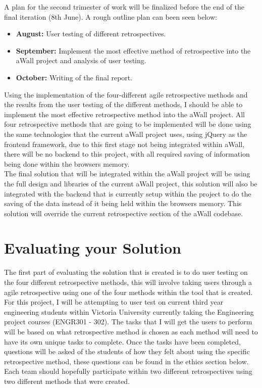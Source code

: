 \documentclass[11pt, a4paper, twoside, openright]{report}
\begin{document}
A plan for the second trimester of work will be finalized before the end of the final iteration (8th June). A rough outline plan can been seen below:
\begin{itemize}
\item \textbf{August:} User testing of different retrospectives.
\item \textbf{September:} Implement the most effective method of retrospective into the aWall project and analysis of user testing.
\item \textbf{October:} Writing of the final report.
\end{itemize}

Using the implementation of the four-different agile retrospective methods and the results from the user testing of the different methods, I should be able to implement the most effective retrospective method into the aWall project. All four retrospective methods that are going to be implemented will be done using the same technologies that the current aWall project uses, using jQuery as the frontend framework, due to this first stage not being integrated within aWall, there will be no backend to this project, with all required saving of information being done within the browsers memory. \\

The final solution that will be integrated within the aWall project will be using the full design and libraries of the current aWall project, this solution will also be integrated with the backend that is currently setup within the project to do the saving of the data instead of it being held within the browsers memory. This solution will override the current retrospective section of the aWall codebase.

\section*{Evaluating your Solution}

The first part of evaluating the solution that is created is to do user testing on the four different retrospective methods, this will involve taking users through a agile retrospective using one of the four methods within the tool that is created. For this project, I will be attempting to user test on current third year engineering students within Victoria University currently taking the Engineering project courses (ENGR301 - 302). The tasks that I will get the users to perform will be based on what retrospective method is chosen as each method will need to have its own unique tasks to complete. Once the tasks have been completed, questions will be asked of the students of how they felt about using the specific retrospective method, these questions can be found in the ethics section below. Each team should hopefully participate within two different retrospectives using two different methods that were created. \\
\end{document}
